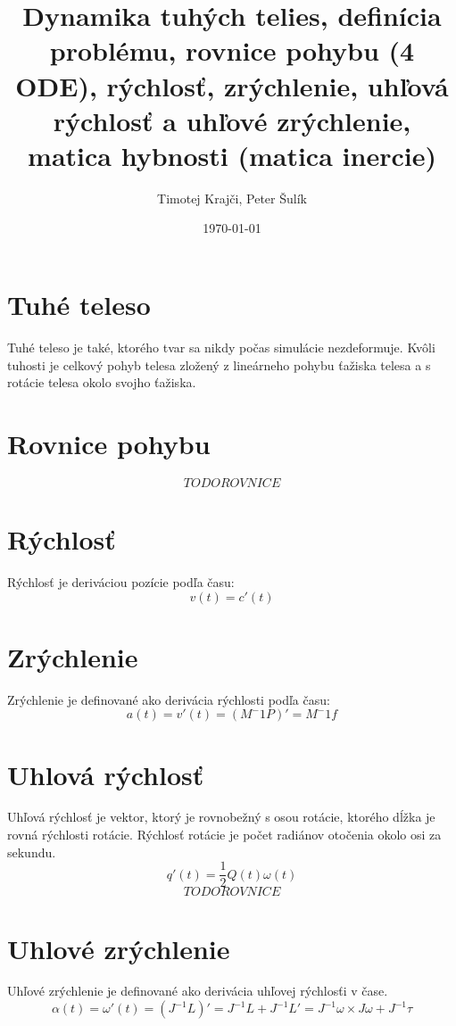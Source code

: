\documentclass[paper=a4, fontsize=11pt]{scrartcl} %
\title{	
Dynamika tuhých telies, definícia problému, rovnice pohybu (4 ODE), rýchlosť, zrýchlenie, uhľová rýchlosť a uhľové zrýchlenie, matica hybnosti (matica inercie) \\ %
}
\author{Timotej Krajči, Peter Šulík} %
\date{\normalsize\today} %
\numberwithin{equation}{section} %
\numberwithin{figure}{section} %
\numberwithin{table}{section} %
\begin{document}
\maketitle %


\section{Tuhé teleso}

Tuhé teleso je také, ktorého tvar sa nikdy počas simulácie nezdeformuje. Kvôli tuhosti je
celkový pohyb telesa zložený z lineárneho pohybu ťažiska telesa a s rotácie telesa okolo
svojho ťažiska.

\section{Rovnice pohybu}
$$ TODO ROVNICE $$

\section{Rýchlosť}
Rýchlosť je deriváciou pozície podľa času: $$v(t) = c'(t)$$

\section{Zrýchlenie}
Zrýchlenie je definované ako derivácia rýchlosti podľa času:
$$ a(t) = v'(t) = (M^-1P)' = M^-1f$$

\section{Uhlová rýchlosť}
Uhľová rýchlosť je vektor, ktorý je rovnobežný s osou rotácie, ktorého dĺžka je  rovná rýchlosti rotácie. Rýchlosť rotácie je počet radiánov otočenia okolo osi za sekundu.
$$ q'(t) = \frac{1}{2}Q(t)\omega(t)$$
$$ TODO ROVNICE $$

\section{Uhlové zrýchlenie}
Uhľové zrýchlenie je definované ako derivácia uhľovej rýchlosťi v čase.
$$\alpha(t) = \omega'(t) = (J^{-1}L)' = J^{-1}L + J^{-1}L' = J^{-1}\omega \times J\omega + J^{-1} \tau $$
\end{document}

